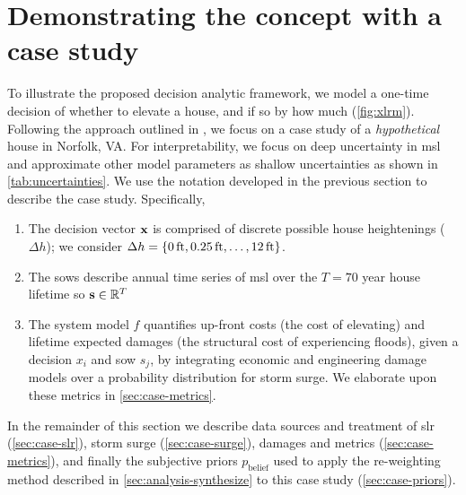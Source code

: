 \documentclass{agujournal2019}
\begin{document}
\section{Demonstrating the concept with a case study}\label{sec:case-study}

To illustrate the proposed decision analytic framework, we model a one-time decision of whether to elevate a house, and if so by how much (\cref{fig:xlrm}).
Following the approach outlined in , we focus on a case study of a \emph{hypothetical} house in Norfolk, VA.
For interpretability, we focus on deep uncertainty in \gls{msl} and approximate other model parameters as shallow uncertainties as shown in \cref{tab:uncertainties}.
We use the notation developed in the previous section to describe the case study.
Specifically,
\begin{enumerate}
  \item The decision vector $\vb{x}$ is comprised of discrete possible house heightenings ($\Delta h$); we consider $\Delta h = \qty{\SI{0}{ft}, \SI{0.25}{ft}, \ldots, \SI{12}{ft}}$.
  \item The \glspl{sow} describe annual time series of \gls{msl} over the $T=70$ year house lifetime so $\vb{s} \in \mathbb{R}^T$
  \item The system model $f$ quantifies up-front costs (the cost of elevating) and lifetime expected damages (the structural cost of experiencing floods), given a decision $x_i$ and \gls{sow} $s_j$, by integrating economic and engineering damage models over a probability distribution for storm surge. We elaborate upon these metrics in \cref{sec:case-metrics}.
\end{enumerate}
In the remainder of this section we describe data sources and treatment of \gls{slr} (\cref{sec:case-slr}), storm surge (\cref{sec:case-surge}), damages and metrics (\cref{sec:case-metrics}), and finally the subjective priors $p_\mathrm{belief}$ used to apply the re-weighting method described in \cref{sec:analysis-synthesize} to this case study (\cref{sec:case-priors}).
\end{document}
